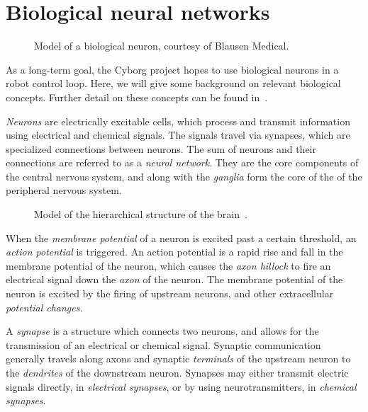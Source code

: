 \documentclass[\rootfolder/main.tex]{subfiles}
\begin{document}

\section{Biological neural networks}

\begin{figure}
    \caption[Model of a biological neuron.]%
            {Model of a biological neuron, courtesy of Blausen Medical.}
    \label{fig:biological_neuron}
\end{figure}

As a long-term goal, the Cyborg project hopes to use biological neurons in a robot control loop.
Here, we will give some background on relevant biological concepts.
Further detail on these concepts can be found in~\cite{Knudsen2016}.

\emph{Neurons} are electrically excitable cells, which process and transmit information using electrical and chemical signals.
The signals travel via synapses, which are specialized connections between neurons.
The sum of neurons and their connections are referred to as a \emph{neural network}.
They are the core components of the central nervous system, and along with the \emph{ganglia} form the core of the of the peripheral nervous system.

\begin{wrapfigure}{R}{0.5\columnwidth}
    \caption[Model of the hierarchical structure of the brain.]%
            {Model of the hierarchical structure of the brain~\cite{Perry1999}.}
    \label{fig:brain-hierarchy}
\end{wrapfigure}

When the \emph{membrane potential} of a neuron is excited past a certain threshold, an \emph{action potential} is triggered.
An action potential is a rapid rise and fall in the membrane potential of the neuron, which causes the \emph{axon hillock} to fire an electrical signal down the \emph{axon} of the neuron.
The membrane potential of the neuron is excited by the firing of upstream neurons, and other extracellular \emph{potential changes}.

A \emph{synapse} is a structure which connects two neurons, and allows for the transmission of an electrical or chemical signal.
Synaptic communication generally travels along axons and synaptic \emph{terminals} of the upstream neuron to the \emph{dendrites} of the downstream neuron.
Synapses may either transmit electric signals directly, in \emph{electrical synapses}, or by using neurotransmitters, in \emph{chemical synapses}.
\end{document}
